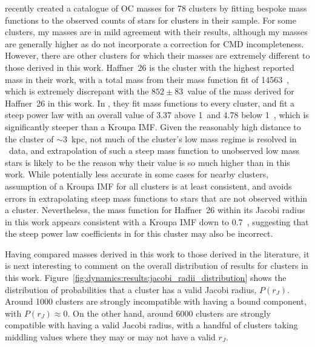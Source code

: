 \cite{cordoni_photometric_binaries_2023} recently created a catalogue of OC masses for 78 clusters by fitting bespoke mass functions to the observed counts of stars for clusters in their sample. For some clusters, my masses are in mild agreement with their results, although my masses are generally higher as \cite{cordoni_photometric_binaries_2023} do not incorporate a correction for CMD incompleteness. However, there are other clusters for which their masses are extremely different to those derived in this work. Haffner~26 is the cluster with the highest reported mass in their work, with a total mass from their mass function fit of 14563~\MSun, which is extremely discrepant with the $852\pm83$~\MSun value of the mass derived for Haffner~26 in this work. In \cite{cordoni_photometric_binaries_2023}, they fit mass functions to every cluster, and fit a steep power law with an overall value of 3.37 above 1~\MSun and 4.78 below 1~\MSun, which is significantly steeper than a Kroupa IMF. Given the reasonably high distance to the cluster of $\sim 3$~kpc, not much of the cluster's low mass regime is resolved in \gaia\ data, and extrapolation of such a steep mass function to unobserved low mass stars is likely to be the reason why their value is so much higher than in this work. While potentially less accurate in some cases for nearby clusters, assumption of a Kroupa IMF for all clusters is at least consistent, and avoids errors in extrapolating steep mass functions to stars that are not observed within a cluster. Nevertheless, the mass function for Haffner~26 within its Jacobi radius in this work appears consistent with a Kroupa IMF down to 0.7~\MSun, suggesting that the steep power law coefficients in \cite{cordoni_photometric_binaries_2023} for this cluster may also be incorrect.

Having compared masses derived in this work to those derived in the literature, it is next interesting to comment on the overall distribution of results for clusters in this work. Figure~\ref{fig:dynamics:results:jacobi_radii_distribution} shows the distribution of probabilities that a cluster has a valid Jacobi radius, $P(r_J)$. Around 1000 clusters are strongly incompatible with having a bound component, with $P(r_J)\approx0$. On the other hand, around 6000 clusters are strongly compatible with having a valid Jacobi radius, with a handful of clusters taking middling values where they may or may not have a valid $r_J$.

